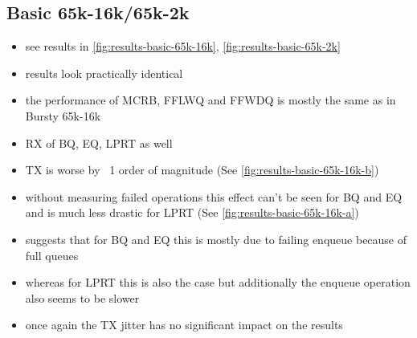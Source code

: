 \subsection{Basic 65k-16k/65k-2k}
\begin{itemize}
    \item see results in \autoref{fig:results-basic-65k-16k}, \autoref{fig:results-basic-65k-2k}
    \item results look practically identical
    \item the performance of MCRB, FFLWQ and FFWDQ is mostly the same as in Bursty 65k-16k
    \item RX of BQ, EQ, LPRT as well
    \item TX is worse by ~1 order of magnitude (See \autoref{fig:results-basic-65k-16k-b})
    \item without measuring failed operations this effect can't be seen for BQ and EQ and is much less drastic for LPRT (See \autoref{fig:results-basic-65k-16k-a})
    \item suggests that for BQ and EQ this is mostly due to failing enqueue because of full queues
    \item whereas for LPRT this is also the case but additionally the enqueue operation also seems to be slower
    \item once again the TX jitter has no significant impact on the results
\end{itemize}
